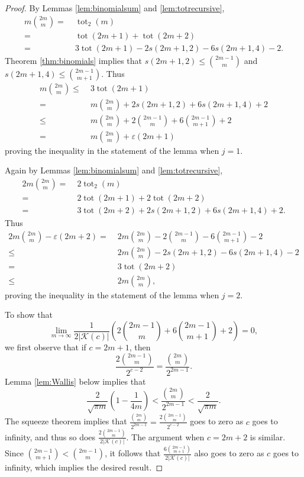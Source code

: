 \documentclass[12pt]{amsart}
\theoremstyle{definition}
\theoremstyle{remark}
\numberwithin{equation}{section}
\def\red{\color{red}}
\def\tot{\operatorname{tot}}
\begin{document}
\begin{proof}
By Lemmas \ref{lem:binomialsum} and \ref{lem:totrecursive}, 
\begin{align*}
    m\binom{2m}{m} = & \; \tot_2(m)\\
    = & \; \tot(2m+1) + \tot(2m+2)\\
    = & \; 3\tot(2m+1) -2s(2m+1,2) - 6s(2m+1,4) - 2.
\end{align*}
Theorem \ref{thm:binomials} implies that $s(2m+1,2)\leq \binom{2m-1}{m}$ and $s(2m+1,4)\leq \binom{2m-1}{m+1}$. Thus
\begin{align*}
    m\binom{2m}{m} \leq & \;  3\tot(2m+1)\\
    = & \; m\binom{2m}{m} + 2s(2m+1,2)+6s(2m+1,4)+2\\
    \leq & \; m\binom{2m}{m} +2 \binom{2m-1}{m} + 6\binom{2m-1}{m+1}+2\\
    = & \; m\binom{2m}{m} + \varepsilon(2m+1)
\end{align*}
proving the inequality in the statement of the lemma when $j=1$.


Again by Lemmas \ref{lem:binomialsum} and \ref{lem:totrecursive}, 
\begin{align*}
    2m\binom{2m}{m} = & \; 2\tot_2(m)\\
    = & \; 2\tot(2m+1) + 2\tot(2m+2)\\
    = & \; 3\tot(2m+2) + 2s(2m+1,2) + 6s(2m+1,4) + 2.
\end{align*}
Thus
\begin{align*}
2m\binom{2m}{m} - \varepsilon(2m+2) = & \; 2m\binom{2m}{m} -2 \binom{2m-1}{m} - 6\binom{2m-1}{m+1}-2\\
 \leq  & \;  2m\binom{2m}{m} - 2s(2m+1,2)- 6s(2m+1,4)-2\\
= & \; 3\tot(2m+2)\\
\leq & \; 2m\binom{2m}{m},
\end{align*}
proving the inequality in the statement of the lemma when $j=2$.

To show that 
        \[\lim_{m\to\infty} \frac{1}{2|\mathcal{K}(c)|} \left(2\binom{2m-1}{m}+6\binom{2m-1}{m+1}+2 \right) = 0,\]
we first observe that if $c=2m+1$, then
\[   \frac{2\binom{2m-1}{m}}{2^{c-2}} = \frac{\binom{2m}{m}}{2^{2m-1}}.\]
Lemma \ref{lem:Wallis} below implies that
\[\frac{2}{\sqrt{\pi m}}\left(1-\frac{1}{4m}\right) < \frac{\binom{2m}{m}}{2^{2m-1}} < \frac{2}{\sqrt{\pi m}}. \]
The squeeze theorem implies that $\frac{\binom{2m}{m}}{2^{2m-1}}=\frac{2\binom{2m-1}{m}}{2^{c-2}}$ goes to zero as $c$ goes to infinity, and thus so does $\frac{2\binom{2m-1}{m}}{2|\mathcal{K}(c)|}$. The argument when $c=2m+2$ is similar. Since $\binom{2m-1}{m+1} < \binom{2m-1}{m}$, it follows that  $\frac{6\binom{2m-1}{m+1}}{2|\mathcal{K}(c)|}$ also goes to zero as $c$ goes to infinity, which implies the desired result.
\end{proof}
\end{document}
